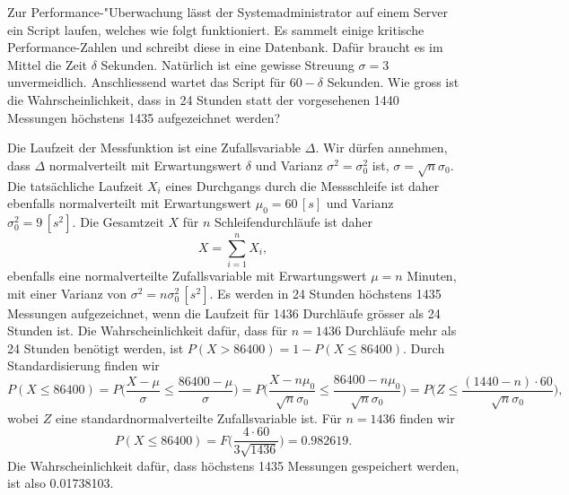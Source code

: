 Zur Performance-"Uberwachung lässt der Systemadministrator auf einem Server
ein Script laufen, welches wie folgt funktioniert. Es sammelt einige
kritische Performance-Zahlen und schreibt diese in eine Datenbank.
Dafür braucht es im Mittel die Zeit $\delta$ Sekunden. Natürlich
ist eine gewisse Streuung $\sigma=3$ unvermeidlich.
Anschliessend wartet das Script für $60-\delta$ Sekunden.
Wie gross ist die Wahrscheinlichkeit, dass in 24 Stunden statt
der vorgesehenen 1440 Messungen höchstens 1435 aufgezeichnet werden?

\begin{loesung}
Die Laufzeit der Messfunktion ist eine Zufallsvariable $\Delta$.
Wir dürfen annehmen, dass $\Delta$ normalverteilt mit Erwartungswert
$\delta$ und Varianz $\sigma^2=\sigma_0^2$ ist, $\sigma=\sqrt{n}\sigma_0$.
Die tatsächliche Laufzeit $X_i$ eines
Durchgangs durch die Messschleife ist daher ebenfalls normalverteilt
mit Erwartungswert $\mu_0=60\,[s]$ und Varianz $\sigma_0^2=9\,[s^2]$.
Die Gesamtzeit $X$ für
$n$ Schleifendurchläufe ist daher
\[
X=\sum_{i=1}^nX_i,
\]
ebenfalls eine normalverteilte Zufallsvariable
mit Erwartungswert $\mu = n$ Minuten,
mit einer Varianz von $\sigma^2=n\sigma_0^2\,[s^2]$.
Es werden in 24 Stunden höchstens 1435 Messungen aufgezeichnet,
wenn die Laufzeit für
1436 Durchläufe grösser als 24 Stunden ist. Die Wahrscheinlichkeit dafür,
dass für $n=1436$ Durchläufe mehr als 24 Stunden benötigt werden, 
ist $P(X > 86400) = 1-P(X\le 86400)$.
Durch Standardisierung finden wir
\[
P(X\le 86400)=P\biggl(
\frac{X-\mu}{\sigma}
\le
\frac{86400-\mu}{\sigma}
\biggr)
=
P\biggl(
\frac{X-n\mu_0}{\sqrt{n}\sigma_0}
\le
\frac{86400-n\mu_0}{\sqrt{n}\sigma_0}
\biggr)
=
P\biggl(
Z\le\frac{(1440-n)\cdot 60}{\sqrt{n}\sigma_0}
\biggr),
\]
wobei $Z$ eine standardnormalverteilte Zufallsvariable ist. Für $n=1436$
finden wir
\[
P(X\le 86400)=F\biggl(
\frac{4\cdot 60}{3\sqrt{1436}}
\biggr)=0.982619.
\]
Die Wahrscheinlichkeit dafür, dass höchstens 1435 Messungen gespeichert
werden, ist also 0.01738103.
\end{loesung}

